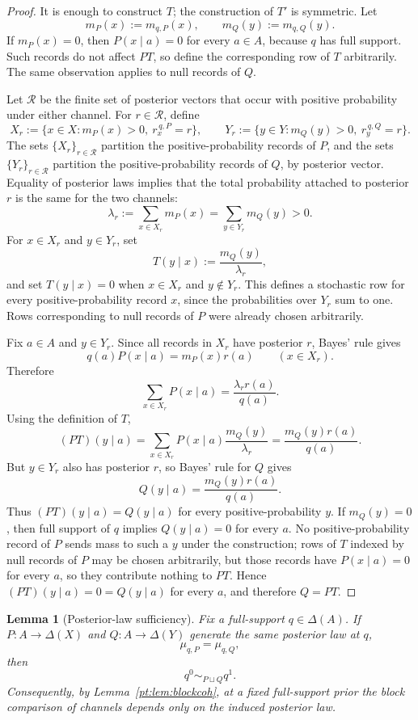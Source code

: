 \documentclass[11pt,a4paper]{article}
\newtheorem{lemma}[theorem]{Lemma}
\theoremstyle{definition}
\newcommand{\1}{\mathbf 1}
\begin{document}
\begin{proof}
It is enough to construct $T$; the construction of $T'$ is symmetric.  Let
\[
m_P(x):=m_{q,P}(x),\qquad m_Q(y):=m_{q,Q}(y).
\]
If $m_P(x)=0$, then $P(x\mid a)=0$ for every $a\in A$, because $q$ has full support.  Such records do not affect
$PT$, so define the corresponding row of $T$ arbitrarily.  The same observation applies to null records of $Q$.

Let $\mathcal R$ be the finite set of posterior vectors that occur with positive probability under either channel.  For
$r\in\mathcal R$, define
\[
X_r:=\{x\in X:m_P(x)>0,\ r_x^{\,q,P}=r\},
\qquad
Y_r:=\{y\in Y:m_Q(y)>0,\ r_y^{\,q,Q}=r\}.
\]
The sets $\{X_r\}_{r\in\mathcal R}$ partition the positive-probability records of $P$, and the sets
$\{Y_r\}_{r\in\mathcal R}$ partition the positive-probability records of $Q$, by posterior vector.
Equality of posterior laws implies that the total probability attached to posterior $r$ is the same for the two
channels:
\[
\lambda_r:=\sum_{x\in X_r}m_P(x)=\sum_{y\in Y_r}m_Q(y)>0.
\]
For $x\in X_r$ and $y\in Y_r$, set
\[
T(y\mid x):=\frac{m_Q(y)}{\lambda_r},
\]
and set $T(y\mid x)=0$ when $x\in X_r$ and $y\notin Y_r$.  This defines a stochastic row for every positive-probability
record $x$, since the probabilities over $Y_r$ sum to one.  Rows corresponding to null records of $P$ were already
chosen arbitrarily.

Fix $a\in A$ and $y\in Y_r$.  Since all records in $X_r$ have posterior $r$, Bayes' rule gives
\[
q(a)P(x\mid a)=m_P(x)r(a)
\qquad(x\in X_r).
\]
Therefore
\[
\sum_{x\in X_r}P(x\mid a)
=
\frac{\lambda_r r(a)}{q(a)}.
\]
Using the definition of $T$,
\[
(PT)(y\mid a)
=
\sum_{x\in X_r}P(x\mid a)\frac{m_Q(y)}{\lambda_r}
=
\frac{m_Q(y)r(a)}{q(a)}.
\]
But $y\in Y_r$ also has posterior $r$, so Bayes' rule for $Q$ gives
\[
Q(y\mid a)=\frac{m_Q(y)r(a)}{q(a)}.
\]
Thus $(PT)(y\mid a)=Q(y\mid a)$ for every positive-probability $y$.  If $m_Q(y)=0$, then full support of $q$ implies
$Q(y\mid a)=0$ for every $a$.  No positive-probability record of $P$ sends mass to such a $y$ under the construction;
rows of $T$ indexed by null records of $P$ may be chosen arbitrarily, but those records have $P(x\mid a)=0$ for every
$a$, so they contribute nothing to $PT$.  Hence $(PT)(y\mid a)=0=Q(y\mid a)$ for every $a$, and therefore $Q=PT$.
\end{proof}

\begin{lemma}[Posterior-law sufficiency]\label{pt:lem:plsuff}
Fix a full-support $q\in\Delta(A)$.  If $P:A\to\Delta(X)$ and $Q:A\to\Delta(Y)$ generate the same posterior law at $q$,
\[
\mu_{q,P}=\mu_{q,Q},
\]
then
\[
q^0\sim_{P\sqcup Q}q^1.
\]
Consequently, by Lemma~\ref{pt:lem:blockcoh}, at a fixed full-support prior the block comparison of channels depends only
on the induced posterior law.
\end{lemma}
\end{document}

